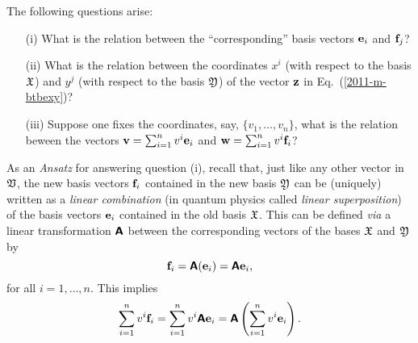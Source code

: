 The following questions arise:
\begin{itemize}
\item[(i)]
What is the relation between the ``corresponding'' basis vectors ${\bf e}_i$ and ${\bf f}_j$?
\item[(ii)]
What is the relation between the coordinates $x^i$ (with respect to the basis  ${\frak X}$) and $y^j$ (with respect to the basis  ${\frak Y}$)  of the vector ${\bf z}$ in Eq.~(\ref{2011-m-btbexy})?
\item[(iii)]
Suppose one fixes the coordinates, say, $\{
{v}_1,
\ldots ,
{v}_n
\}$, what is the relation beween the vectors
${\bf v}=
\sum_{i=1}^n v^i{\bf e}_i
$
and
${\bf w}=
\sum_{i=1}^n v^i{\bf f}_i
$?
\end{itemize}

As an {\it Ansatz} for answering question (i), recall that, just like any other vector in ${\frak V}$,
the new basis vectors ${\bf f}_i$ contained in the new basis ${\frak Y}$
can be (uniquely) written as a {\em linear combination}
(in quantum physics called {\em linear superposition})
of the basis vectors
${\bf e}_i$ contained in the old  basis ${\frak X}$.
This can be defined {\it via}
a linear transformation $\textsf{\textbf{A}}$ between the corresponding vectors of the bases
 ${\frak X}$ and
${\frak Y}$ by
\begin{equation}
{\bf f}_i= \textsf{\textbf{A}}({\bf e}_i)= \textsf{\textbf{A}}{\bf e}_i
,
\label{2011-m-btbe}
\end{equation}
for all $i=1, \ldots , n$.
This implies
\begin{equation}
\sum_{i=1}^n v^i {\bf f}_i= \sum_{i=1}^n v^i \textsf{\textbf{A}}{\bf e}_i
= \textsf{\textbf{A}} \left(\sum_{i=1}^n v^i{\bf e}_i\right)
.
\label{2011-m-btbe-2-implied}
\end{equation}

